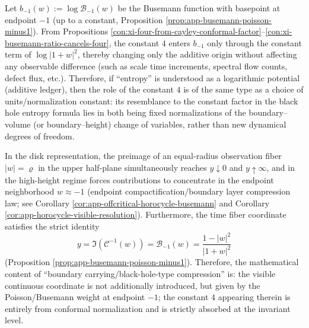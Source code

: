 \begin{proposition}\label{con:xi-four-only-shifts-additive-origin}
Let \(b_{-1}(w):=\log\mathcal{B}_{-1}(w)\) be the Busemann function with basepoint at endpoint \(-1\) (up to a constant, Proposition \ref{prop:app-busemann-poisson-minus1}).
From Propositions \ref{con:xi-four-from-cayley-conformal-factor}--\ref{con:xi-busemann-ratio-cancels-four}, the constant \(4\) enters \(b_{-1}\) only through the constant term of \(\log|1+w|^{2}\), thereby changing only the additive origin without affecting any observable difference (such as scale time increments, spectral flow counts, defect flux, etc.).
Therefore, if ``entropy'' is understood as a logarithmic potential (additive ledger), then the role of the constant \(4\) is of the same type as a choice of units/normalization constant: its resemblance to the constant factor in the black hole entropy formula lies in both being fixed normalizations of the boundary--volume (or boundary--height) change of variables, rather than new dynamical degrees of freedom.
\end{proposition}

\begin{proposition}\label{con:xi-timefiber-equals-poisson-weight}
In the disk representation, the preimage of an equal-radius observation fiber \(|w|=\varrho\) in the upper half-plane simultaneously reaches \(y\downarrow 0\) and \(y\uparrow\infty\), and in the high-height regime forces contributions to concentrate in the endpoint neighborhood \(w\approx -1\) (endpoint compactification/boundary layer compression law; see Corollary \ref{cor:app-offcritical-horocycle-busemann} and Corollary \ref{cor:app-horocycle-visible-resolution}).
Furthermore, the time fiber coordinate satisfies the strict identity
\[
y=\Im(\mathcal{C}^{-1}(w))=\mathcal{B}_{-1}(w)=\frac{1-|w|^{2}}{|1+w|^{2}}
\]
(Proposition \ref{prop:app-busemann-poisson-minus1}).
Therefore, the mathematical content of ``boundary carrying/black-hole-type compression'' is: the visible continuous coordinate is not additionally introduced, but given by the Poisson/Busemann weight at endpoint \(-1\); the constant \(4\) appearing therein is entirely from conformal normalization and is strictly absorbed at the invariant level.
\end{proposition}

